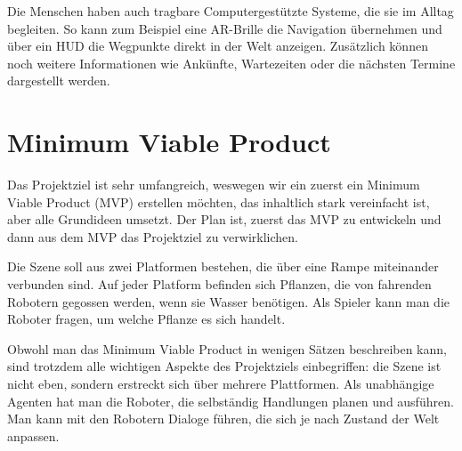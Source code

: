 Die Menschen haben auch tragbare Computergestützte Systeme, die sie im Alltag begleiten. So kann zum Beispiel eine AR-Brille die Navigation übernehmen und über ein HUD die Wegpunkte direkt in der Welt anzeigen. Zusätzlich können noch weitere Informationen wie Ankünfte, Wartezeiten oder die nächsten Termine dargestellt werden.

\section{Minimum Viable Product}

Das Projektziel ist sehr umfangreich, weswegen wir ein zuerst ein Minimum Viable Product (MVP) erstellen möchten, das inhaltlich stark vereinfacht ist, aber alle Grundideen umsetzt. Der Plan ist, zuerst das MVP zu entwickeln und dann aus dem MVP das Projektziel zu verwirklichen.

Die Szene soll aus zwei Platformen bestehen, die über eine Rampe miteinander verbunden sind. Auf jeder Platform befinden sich Pflanzen, die von fahrenden Robotern gegossen werden, wenn sie Wasser benötigen. Als Spieler kann man die Roboter fragen, um welche Pflanze es sich handelt.

Obwohl man das Minimum Viable Product in wenigen Sätzen beschreiben kann, sind trotzdem alle wichtigen Aspekte des Projektziels einbegriffen: die Szene ist nicht eben, sondern erstreckt sich über mehrere Plattformen. Als unabhängige Agenten hat man die Roboter, die selbständig Handlungen planen und ausführen. Man kann mit den Robotern Dialoge führen, die sich je nach Zustand der Welt anpassen.